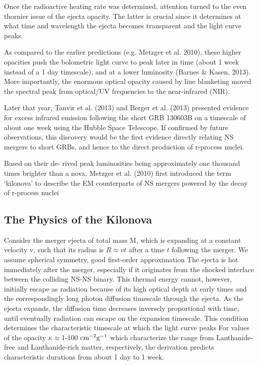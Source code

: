 Once the radioactive heating rate was determined, attention turned to the even thornier issue of the ejecta opacity. The latter is crucial since it determines at what time and wavelength the ejecta becomes transparent and the light curve peaks. 

As compared to the earlier predictions (e.g. Metzger et al. 2010), these higher opacities push the bolometric light curve to peak later in time (about 1 week instead of a 1 day timescale), and at a lower luminosity (Barnes \& Kasen, 2013). More importantly, the enormous optical opacity caused by line blanketing moved the spectral peak from optical/UV frequencies to the near-infrared (NIR).

Later that year, Tanvir et al. (2013) and Berger et al. (2013) presented evidence for excess infrared emission following the short GRB 130603B on a timescale of about one week using the Hubble Space Telescope. If confirmed by future observations, this discovery would be the first evidence directly relating NS mergers to short GRBs, and hence to the direct production of r-process nuclei.

Based on their de- rived peak luminosities being approximately one thousand times brighter than a nova, Metzger et al. (2010) first introduced the term `kilonova' to describe the EM counterparts of NS mergers powered by the decay of r-process nuclei

\subsection{The Physics of the Kilonova}

Consider the merger ejecta of total mass M, which is expanding at a constant velocity v, such that its radius is $R \approx vt$ after a time $t$ following the merger. 
We assume spherical symmetry, good first-order approximation
The ejecta is hot immediately after the merger, especially if it originates from the shocked interface between the colliding NS-NS binary. 
This thermal energy cannot, however, initially escape as radiation because of its high optical depth at early times
and the correspondingly long photon diffusion timescale through the ejecta. 
As the ejecta expands, the diffusion time decreases inversely proportional with time, until eventually radiation can escape on the expansion timescale.
This condition determines the characteristic timescale at which the light curve peaks
For values of the opacity $\kappa \approx $1-100 $\textmd{cm}^{-2}\textmd{g}^{-1}$ which characterize the range from Lanthanide-free and Lanthanide-rich matter, respectively, the derivation predicts characteristic durations from about 1 day to 1 week.

